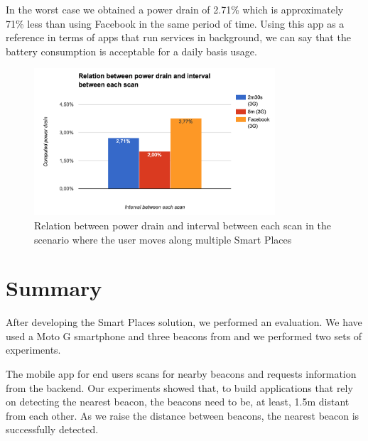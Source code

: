 In the worst case we obtained a power drain of 2.71\% which is approximately 71\% less than using Facebook in the same period of time.
Using this app as a reference in terms of apps that run services in background, we can say that the battery consumption is acceptable for a daily basis usage.


\begin{figure}[!ht]
  \centering
    \includegraphics[width=0.8\textwidth, keepaspectratio]{images/results_battery_walking}
    \caption[Power drain when the user is moving]{Relation between power drain and interval between each scan in the scenario where the user moves along multiple Smart Places}
    \label{fig:results_battery_walking}
\end{figure}

\vfill

\section{Summary}
\label{sec:evaluation_summary}
After developing the Smart Places solution, we performed an evaluation.
We have used a  Moto G smartphone and three beacons from  and we performed two sets of experiments.

The mobile app for end users scans for nearby beacons and requests information from the backend.
Our experiments showed that, to build applications that rely on detecting the nearest beacon, the beacons need to be, at least, 1.5m distant from each other.
As we raise the distance between beacons, the nearest beacon is successfully detected.

